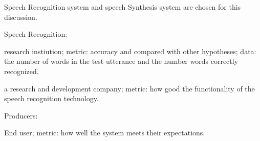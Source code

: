 \documentclass[12pt]{article}
\newenvironment{problem}[2][Problem]{\begin{trivlist}
\item[\hskip \labelsep {\bfseries #1}\hskip \labelsep {\bfseries #2.}]}{\end{trivlist}}
\begin{document}
\pagebreak
\begin{problem}{5.2}
    Speech Recognition system and speech Synthesis system are chosen for this
    discussion.

    Speech Recognition:

    research instiution; %
    metric: accuracy and compared with other hypotheses; 
    data: the number of words in the test utterance and the number words correctly recognized.

    a research and development company; %
    metric: how good the functionality of the speech recognition technology.

    Producers:

    End user; 
    metric: how well the system meets their expectations.

\end{problem}
\end{document}
